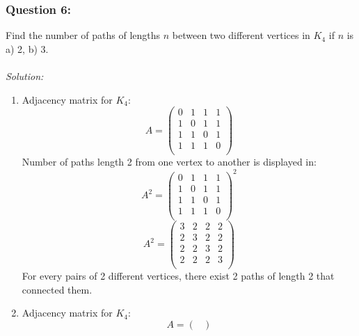 \documentclass[a4paper]{article}
\begin{document}
	\subsubsection*{Question 6:}
	Find the number of paths of lengths $n$ between two different vertices in $K_4$ if $n$ is a) 2, b) 3.\\\\
	\textit{Solution:}
	\begin{enumerate}[label = \alph*)]
	    \item 
    	Adjacency matrix for $K_4$:
    	\begin{equation*}
            A=
            \begin{pmatrix}
            0 & 1 & 1 & 1\\
            1 & 0 & 1 & 1\\
            1 & 1 & 0 & 1\\
            1 & 1 & 1 & 0\\
            \end{pmatrix}
            \end{equation*}
            Number of paths length 2 from one vertex to another is displayed in:
            \begin{equation*}
            A^2=
            \begin{pmatrix}
            0 & 1 & 1 & 1\\
            1 & 0 & 1 & 1\\
            1 & 1 & 0 & 1\\
            1 & 1 & 1 & 0\\
            \end{pmatrix}^2
            \end{equation*}
            \begin{equation*}
            A^2=
            \begin{pmatrix}
            3 & 2 & 2 & 2\\
            2 & 3 & 2 & 2\\
            2 & 2 & 3 & 2\\
            2 & 2 & 2 & 3\\
            \end{pmatrix}
            \end{equation*}
    	    For every pairs of 2 different vertices, there exist 2 paths of length 2 that connected them.
	    \item 
        Adjacency matrix for $K_4$:
    	\begin{equation*}
    	A=
    	\begin{pmatrix}

\end{pmatrix}
\end{equation*}
\end{enumerate}
\end{document}
